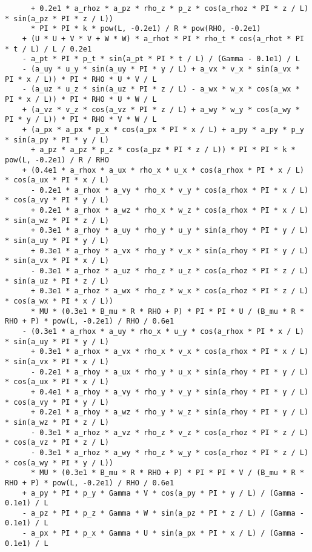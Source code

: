 \documentclass[10pt]{article}
\begin{document}
\begin{small}
\begin{verbatim}
      + 0.2e1 * a_rhoz * a_pz * rho_z * p_z * cos(a_rhoz * PI * z / L) * sin(a_pz * PI * z / L))
      * PI * PI * k * pow(L, -0.2e1) / R * pow(RHO, -0.2e1)
    + (U * U + V * V + W * W) * a_rhot * PI * rho_t * cos(a_rhot * PI * t / L) / L / 0.2e1
    - a_pt * PI * p_t * sin(a_pt * PI * t / L) / (Gamma - 0.1e1) / L
    - (a_uy * u_y * sin(a_uy * PI * y / L) + a_vx * v_x * sin(a_vx * PI * x / L)) * PI * RHO * U * V / L
    - (a_uz * u_z * sin(a_uz * PI * z / L) - a_wx * w_x * cos(a_wx * PI * x / L)) * PI * RHO * U * W / L
    + (a_vz * v_z * cos(a_vz * PI * z / L) + a_wy * w_y * cos(a_wy * PI * y / L)) * PI * RHO * V * W / L
    + (a_px * a_px * p_x * cos(a_px * PI * x / L) + a_py * a_py * p_y * sin(a_py * PI * y / L)
      + a_pz * a_pz * p_z * cos(a_pz * PI * z / L)) * PI * PI * k * pow(L, -0.2e1) / R / RHO
    + (0.4e1 * a_rhox * a_ux * rho_x * u_x * cos(a_rhox * PI * x / L) * cos(a_ux * PI * x / L)
      - 0.2e1 * a_rhox * a_vy * rho_x * v_y * cos(a_rhox * PI * x / L) * cos(a_vy * PI * y / L)
      + 0.2e1 * a_rhox * a_wz * rho_x * w_z * cos(a_rhox * PI * x / L) * sin(a_wz * PI * z / L)
      + 0.3e1 * a_rhoy * a_uy * rho_y * u_y * sin(a_rhoy * PI * y / L) * sin(a_uy * PI * y / L)
      + 0.3e1 * a_rhoy * a_vx * rho_y * v_x * sin(a_rhoy * PI * y / L) * sin(a_vx * PI * x / L)
      - 0.3e1 * a_rhoz * a_uz * rho_z * u_z * cos(a_rhoz * PI * z / L) * sin(a_uz * PI * z / L)
      + 0.3e1 * a_rhoz * a_wx * rho_z * w_x * cos(a_rhoz * PI * z / L) * cos(a_wx * PI * x / L))
      * MU * (0.3e1 * B_mu * R * RHO + P) * PI * PI * U / (B_mu * R * RHO + P) * pow(L, -0.2e1) / RHO / 0.6e1
    - (0.3e1 * a_rhox * a_uy * rho_x * u_y * cos(a_rhox * PI * x / L) * sin(a_uy * PI * y / L)
      + 0.3e1 * a_rhox * a_vx * rho_x * v_x * cos(a_rhox * PI * x / L) * sin(a_vx * PI * x / L)
      - 0.2e1 * a_rhoy * a_ux * rho_y * u_x * sin(a_rhoy * PI * y / L) * cos(a_ux * PI * x / L)
      + 0.4e1 * a_rhoy * a_vy * rho_y * v_y * sin(a_rhoy * PI * y / L) * cos(a_vy * PI * y / L)
      + 0.2e1 * a_rhoy * a_wz * rho_y * w_z * sin(a_rhoy * PI * y / L) * sin(a_wz * PI * z / L)
      - 0.3e1 * a_rhoz * a_vz * rho_z * v_z * cos(a_rhoz * PI * z / L) * cos(a_vz * PI * z / L)
      - 0.3e1 * a_rhoz * a_wy * rho_z * w_y * cos(a_rhoz * PI * z / L) * cos(a_wy * PI * y / L))
      * MU * (0.3e1 * B_mu * R * RHO + P) * PI * PI * V / (B_mu * R * RHO + P) * pow(L, -0.2e1) / RHO / 0.6e1
    + a_py * PI * p_y * Gamma * V * cos(a_py * PI * y / L) / (Gamma - 0.1e1) / L
    - a_pz * PI * p_z * Gamma * W * sin(a_pz * PI * z / L) / (Gamma - 0.1e1) / L
    - a_px * PI * p_x * Gamma * U * sin(a_px * PI * x / L) / (Gamma - 0.1e1) / L

\end{verbatim}
\end{small}
\end{document}
